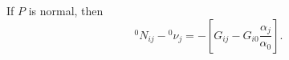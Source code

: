 If $P$ is normal, then
$${}^0N_{ij} - {}^0\nu_j = -\left[G_{ij} - G_{i0}\frac{\alpha_j}{\alpha_0}\right].$$
